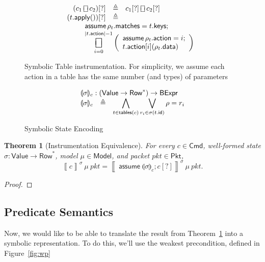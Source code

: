 \documentclass{article}
\newcommand{\pkt}{\mathit{pkt}}
\newcommand{\denote}[1]{\left\llbracket#1\right\rrbracket}
\newcommand{\Value}{\mathsf{Value}}
\newcommand{\BExpr}{\mathsf{BExpr}}
\newcommand{\Cmd}{\mathsf{Cmd}}
\newcommand{\Pkt}{\mathsf{Pkt}}
\newcommand{\Model}{\mathsf{Model}}
\newcommand{\Row}{\mathsf{Row}}
\newcommand{\matches}{\mathsf{matches}}
\newcommand{\action}{\mathsf{action}}
\newcommand{\keys}{\mathsf{keys}}
\newcommand{\data}{\mathsf{data}}
\newcommand{\id}{\mathsf{id}}
\newcommand{\assume}{\mathop{\mathsf{assume}}}
\newcommand{\apply}{\mathsf{apply}}
\newcommand{\choiceop}{\rotatebox[origin=c]{90}{$\sqsubset\!\!\!\sqsupset$}}
\newcommand{\choice}{\mathbin{\choiceop}}
\DeclareMathOperator*{\bigchoice}{\scalerel*{\choiceop}{\sum}}
\newcommand{\state}[1]{\llparenthesis#1\rrparenthesis}
\newcommand{\instr}{[?]}
\newcommand{\tables}{\mathop{\mathsf{tables}}}
\newtheorem{theorem}{Theorem}
\begin{document}
\begin{figure}[htp]
\[\begin{array}{r >{\triangleq}cl}
  (c_1 \choice c_2)\instr && c_1\instr \choice c_2\instr\\
  (t.\apply())\instr &&\\
  \multicolumn{3}{l}{
    \qquad
    \begin{array}[t]{l} \displaystyle
    \assume \rho_t.\matches = t.\keys; \\
    \displaystyle \bigchoice_{i=0}^{|t.\action| -1}
    \left(\begin{array}{l}
    \assume \rho_t.\action = i;\\
    t.\action[i](\rho_t.\data)
    \end{array}\right)\\
  \end{array}}
  \end{array}
  \]
  \caption{Symbolic Table instrumentation. For simplicity, we
    assume each action in a table has the same number (and types) of parameters}
  \label{fig:table-instrument}
\end{figure}

\begin{figure}[htp]
  \[\begin{array}{r cl}
  \multicolumn{3}{l}{\state\sigma_c : (\Value \to \Row^*) \to \BExpr} \\
  \state\sigma_c &\triangleq
  & \displaystyle\bigwedge_{ t \in \tables(c) }
  \bigvee_{r_i \in \sigma(t.\id)} \rho = r_i
  \end{array}
  \]
  \caption{Symbolic State Encoding}
  \label{fig:table-instrument}
\end{figure}

\begin{samepage}
\begin{theorem}[Instrumentation Equivalence]
  \label{thm:instr-equiv}
  For every $c \in \Cmd$, well-formed state $\sigma : \Value \to \Row^*$, model
  $\mu \in \Model$, and packet $\pkt \in \Pkt$, \[\denote{c}^\sigma~\mu~\pkt = \denote{\assume \state\sigma_c; c\instr}^\sigma~\mu~\pkt.\]
\end{theorem}
\begin{proof}
\end{proof}
\end{samepage}

\subsection{Predicate Semantics}

Now, we would like to be able to translate the result from
Theorem~\ref{thm:instr-equiv} into a
symbolic representation. To do this, we'll use the weakest precondition, defined
in Figure~\ref{fig:wp}
\end{document}
